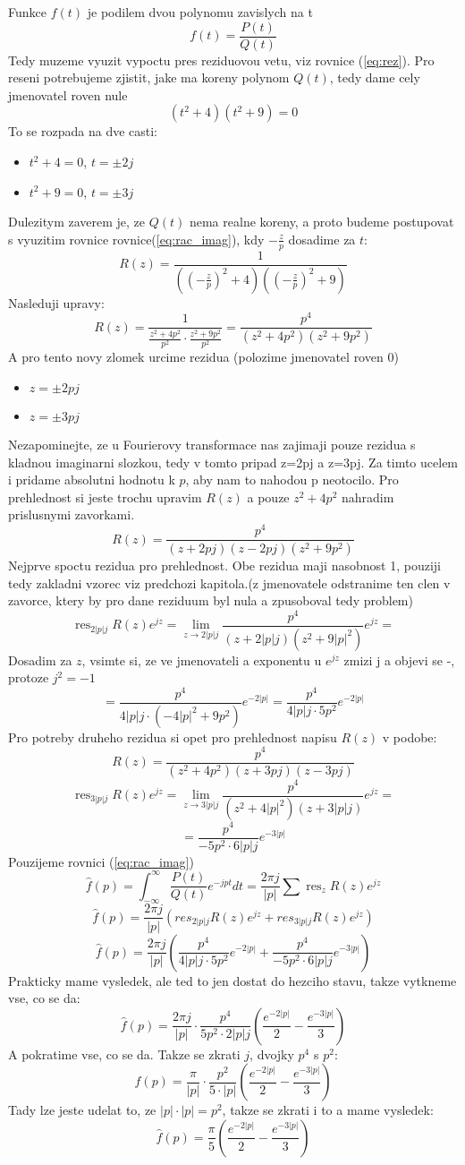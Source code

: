Funkce $f(t)$ je podilem dvou polynomu zavislych na t
$$f(t)=\frac{P(t)}{Q(t)}$$
Tedy muzeme vyuzit vypoctu pres reziduovou vetu, viz rovnice (\ref{eq:rez}). 
Pro reseni potrebujeme zjistit, jake ma koreny polynom $Q(t)$, tedy dame cely jmenovatel roven nule
$$(t^2+4)(t^2+9) = 0$$
To se rozpada na dve casti:
\begin{itemize}
\item $t^2+4=0$, $t=\pm2j$
\item $t^2+9=0$, $t=\pm3j$
\end{itemize}
Dulezitym zaverem je, ze $Q(t)$ nema realne koreny, a proto budeme postupovat s vyuzitim rovnice rovnice(\ref{eq:rac_imag}), kdy $-\frac{z}{p}$ dosadime za $t$:
$$R(z)=\frac{1}{\left( \left(-\frac{z}{p} \right)^2+ 4 \right)\left( \left(-\frac{z}{p} \right)^2+ 9 \right)}$$
Nasleduji upravy:
$$R(z)=\frac{1}{\frac{z^2+4p^2}{p^2}\cdot \frac{z^2+9p^2}{p^2}}= \frac{p^4}{(z^2+4p^2)(z^2+9p^2)}$$
A pro tento novy zlomek urcime rezidua (polozime jmenovatel roven 0)
\begin{itemize}
\item $z=\pm2pj$
\item $z=\pm3pj$
\end{itemize}
Nezapominejte, ze u Fourierovy transformace nas zajimaji pouze rezidua s kladnou imaginarni slozkou, tedy v tomto pripad z=2pj a z=3pj. Za timto ucelem i pridame absolutni hodnotu k $p$, aby nam to nahodou p neotocilo. Pro prehlednost si jeste trochu upravim $R(z)$ a pouze $z^2+4p^2$ nahradim prislusnymi zavorkami.
$$R(z)= \frac{p^4}{(z+2pj)(z-2pj)(z^2+9p^2)}$$
Nejprve spoctu rezidua pro prehlednost. Obe rezidua maji  nasobnost 1, pouziji tedy zakladni vzorec viz predchozi kapitola.(z jmenovatele odstranime ten clen v zavorce, ktery by pro dane reziduum byl nula a zpusoboval tedy problem)
$$\operatorname{res}_{2|p|j}R(z)e^{jz}= \lim_{z \to 2|p|j} \frac{p^4}{(z+2|p|j)(z^2+9|p|^2)}e^{jz} = $$
Dosadim za $z$, vsimte si, ze ve jmenovateli a exponentu u $e^{jz}$ zmizi j a objevi se -, protoze $j^2=-1$
$$=\frac{p^4}{4|p|j\cdot(-4|p|^2+9p^2)}e^{-2|p|}= \frac{p^4}{4|p|j\cdot 5p^2}e^{-2|p|}$$
Pro potreby druheho rezidua si opet pro prehlednost napisu $R(z)$ v podobe:
$$R(z)=\frac{p^4}{(z^2+4p^2)(z+3pj)(z-3pj)}$$
$$\operatorname{res}_{3|p|j}R(z)e^{jz}= \lim_{z \to 3|p|j} \frac{p^4}{(z^2+4|p|^2)(z+3|p|j)}e^{jz} = $$
$$=\frac{p^4}{-5p^2\cdot6|p|j}e^{-3|p|}$$
Pouzijeme rovnici (\ref{eq:rac_imag})
$$\hat{f}(p)=\int_{-\infty}^{\infty} \frac{P(t)}{Q(t)}e^{-jpt}dt = \frac{2 \pi j}{|p|}\sum \operatorname{res}_z R(z)e^{jz}$$
$$\hat{f}(p)=\frac{2\pi j}{|p|}({res}_{2|p|j}R(z)e^{jz}+{res}_{3|p|j}R(z)e^{jz})$$
$$\hat{f}(p)=\frac{2\pi j}{|p|}\left(\frac{p^4}{4|p|j\cdot 5p^2}e^{-2|p|} + \frac{p^4}{-5p^2\cdot6|p|j}e^{-3|p|} \right)$$
Prakticky mame vysledek, ale ted to jen dostat do hezciho stavu, takze vytkneme vse, co se da:
$$\hat{f}(p)=\frac{2\pi j}{|p|}\cdot \frac{p^4}{5p^2\cdot2|p|j}\left(\frac{e^{-2|p|}}{2}-\frac{e^{-3|p|}}{3}\right)$$
A pokratime vse, co se da. Takze se zkrati $j$, dvojky $p^4$ s $p^2$:
$$\hat{f}(p)=\frac{\pi}{|p|}\cdot \frac{p^2}{5\cdot|p|}\left(\frac{e^{-2|p|}}{2}-\frac{e^{-3|p|}}{3}\right)$$
Tady lze jeste udelat to, ze $|p|\cdot|p| = p^2$, takze se zkrati i to a mame vysledek:
$$\hat{f}(p)=\frac{\pi}{5}\left(\frac{e^{-2|p|}}{2}-\frac{e^{-3|p|}}{3}\right)$$


